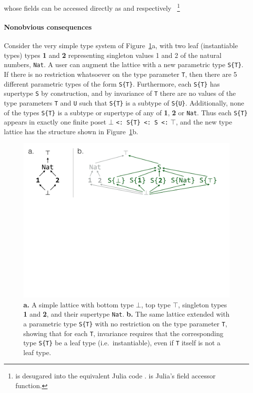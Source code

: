 \documentclass[pldi]{sigplanconf-pldi15}
\begin{document}
whose fields can be accessed directly as  and  respectively~
\footnote{ is desugared into the equivalent Julia code .
 is Julia's field accessor function.}


\paragraph{Nonobvious consequences}

Consider the very simple type system of Figure~\ref{fig:lattice}a, with two
leaf (instantiable types) types \textbf{1} and \textbf{2} representing
singleton values 1 and 2 of the natural numbers, \verb|Nat|. A user can
augment the lattice with a new parametric type \verb|S{T}|. If there is no
restriction whatsoever on the type parameter \verb|T|, then there are 5
different parametric types of the form \verb|S{T}|. Furthermore, each
\verb|S{T}| has supertype \verb|S| by construction, and by invariance of
\verb|T| there are no values of the type parameters \verb|T| and \verb|U| such
that \verb|S{T}| is a subtype of \verb|S{U}|. Additionally, none of the types
\verb|S{T}| is a subtype or supertype of any of \textbf{1}, \textbf{2} or
\verb|Nat|.  Thus each \verb|S{T}| appears in exactly one finite poset $\bot$
\verb|<: S{T} <: S <:| $\top$, and the new type lattice has the structure shown
in Figure~\ref{fig:lattice}b.

\begin{figure}
	\centering
	\includegraphics[width=\columnwidth]{fig-lattice}
	\caption{
		\textbf{a.} A simple lattice with bottom type $\bot$, top type
		$\top$, singleton types \textbf{1} and \textbf{2}, and their
		supertype \texttt{Nat}.
		\textbf{b.} The same lattice extended with a parametric type
		\texttt{S\{T\}} with no restriction on the type parameter
		\texttt{T}, showing that for each \texttt{T}, invariance
		requires that the corresponding type \texttt{S\{T\}} be a leaf
		type (i.e.\ instantiable), even if \texttt{T} itself is not a
		leaf type.}
	\label{fig:lattice}
\end{figure}
\end{document}
